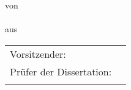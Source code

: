 \begin{titlepage}
    \makeatletter
    \showtubslogo[left]
    \showlogo{\tubs@tp@logo}
    \showtopline
    \begin{titlerow}{1}
        \begin{center}
            {\@title\par}%
        \end{center}
    \end{titlerow}
    \begin{titlerow}{3}
        \begin{center}
            \sffamily%
            {\par}\bigskip%
            \vfill%
            {\@subtitle}\bigskip%
            \vfill\vfill%
		{{von} \\
			\vspace{.5cm}
			{\@author} \\
			\vspace{.5cm}
			{aus\\
			\vspace{.5cm}
			\Geburtsort}
		}\bigskip%
            \vfill
            {\noindent{}\@date}%
        \end{center}
    \end{titlerow}
    \begin{titlerow}{1}
        \begin{minipage}{0.6\textwidth}
            \begin{flushleft}
		\begin{tabular}{ll}
			Vorsitzender: & \chairman\\
			Prüfer der Dissertation: & \examinera\\
			& \examinerb
		\end{tabular}

\end{flushleft}
\end{minipage}
\end{titlerow}
\end{titlepage}
